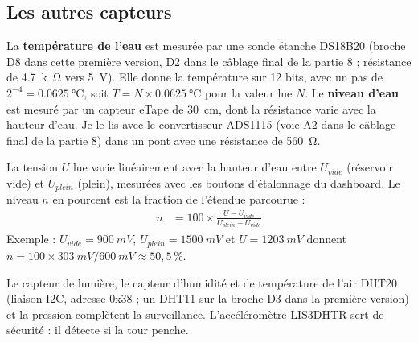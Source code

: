 \subsection{Les autres capteurs}

La \textbf{température de l'eau} est mesurée par une sonde étanche DS18B20 (broche D8 dans cette première version, D2 dans le câblage final de la partie 8 ; résistance de \qty{4,7}{k\ohm} vers \qty{5}{V}). Elle donne la température sur 12 bits, avec un pas de $2^{-4} = \qty{0,0625}{\celsius}$, soit $T = N \times \qty{0,0625}{\celsius}$ pour la valeur lue $N$. Le \textbf{niveau d'eau} est mesuré par un capteur eTape de \qty{30}{cm}, dont la résistance varie avec la hauteur d'eau. Je le lis avec le convertisseur ADS1115 (voie A2 dans le câblage final de la partie 8) dans un pont avec une résistance de \qty{560}{\ohm}.

\begin{demonstration}
La tension $U$ lue varie linéairement avec la hauteur d'eau entre $U_{vide}$ (réservoir vide) et $U_{plein}$ (plein), mesurées avec les boutons d'étalonnage du dashboard. Le niveau $n$ en pourcent est la fraction de l'étendue parcourue :
\begin{align*}
n &= 100 \times \frac{U - U_{vide}}{U_{plein} - U_{vide}}
\end{align*}
Exemple : $U_{vide} = \qty{900}{mV}$, $U_{plein} = \qty{1500}{mV}$ et $U = \qty{1203}{mV}$ donnent $n = 100 \times \qty{303}{mV}/\qty{600}{mV} \approx 50{,}5\,\%$.
\end{demonstration}

Le capteur de lumière, le capteur d'humidité et de température de l'air DHT20 (liaison I2C, adresse 0x38 ; un DHT11 sur la broche D3 dans la première version) et la pression complètent la surveillance. L'accéléromètre LIS3DHTR sert de sécurité : il détecte si la tour penche.

